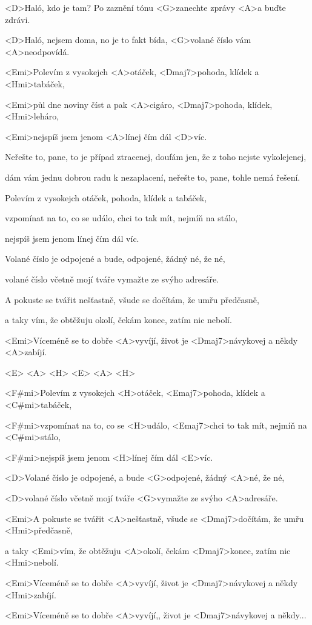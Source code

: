 
\zs
<D>Haló, kdo je tam? Po zaznění tónu
<G>zanechte zprávy <A>a buďte zdrávi.

<D>Haló, nejsem doma, no je to fakt bída,
<G>volané číslo vám <A>neodpovídá.
\ks

\zr
<Emi>Polevím z vysokejch <A>otáček,
<Dmaj7>pohoda, klídek a <Hmi>tabáček,

<Emi>půl dne noviny číst a pak <A>cigáro,
<Dmaj7>pohoda, klídek, <Hmi>leháro,

<Emi>nejspíš jsem jenom <A>línej čím dál <D>víc.
\kr

\zs
Neřešte to, pane, to je případ ztracenej,
doufám jen, že z toho nejste vykolejenej,

dám vám jednu dobrou radu k nezaplacení,
neřešte to, pane, tohle nemá řešení.

\ks

\zr
Polevím z vysokejch otáček,
pohoda, klídek a tabáček,

vzpomínat na to, co se událo,
chci to tak mít, nejmíň na stálo,

nejspíš jsem jenom línej čím dál víc.
\kr

\zs
Volané číslo je odpojené a bude,
odpojené, žádný né, že né,

volané číslo včetně mojí tváře
vymažte ze svýho adresáře.

\ks

\zr
A pokuste se tvářit nešťastně,
všude se dočítám, že umřu předčasně,

a taky vím, že obtěžuju okolí,
čekám konec, zatím nic nebolí.

<Emi>Víceméně se to dobře <A>vyvíjí,
život je <Dmaj7>návykovej a někdy <A>zabíjí.
\kr


<E> <A> <H> 
<E> <A> <H> 

\zr
<F#mi>Polevím z vysokejch <H>otáček,
<Emaj7>pohoda, klídek a <C#mi>tabáček,

<F#mi>vzpomínat na to, co se <H>událo,
<Emaj7>chci to tak mít, nejmíň na <C#mi>stálo,

<F#mi>nejspíš jsem jenom <H>línej čím dál <E>víc.
\kr

\zs
<D>Volané číslo je odpojené,
a bude <G>odpojené, žádný <A>né, že né,

<D>volané číslo včetně mojí tváře
<G>vymažte ze svýho <A>adresáře.

\ks

\zs
<Emi>A pokuste se tvářit <A>nešťastně,
všude se <Dmaj7>dočítám, že umřu <Hmi>předčasně,

a taky <Emi>vím, že obtěžuju <A>okolí,
čekám <Dmaj7>konec, zatím nic <Hmi>nebolí.
\ks

\zs
<Emi>Víceméně se to dobře <A>vyvíjí,
život je <Dmaj7>návykovej a někdy <Hmi>zabíjí.

<Emi>Víceméně se to dobře <A>vyvíjí,,
život je <Dmaj7>návykovej a někdy...
\ks
\kp
